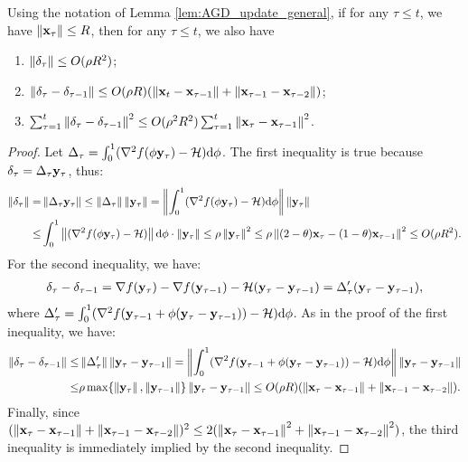 \begin{proposition} \label{prop:delta} Using the notation of Lemma \ref{lem:AGD_update_general},
if for any $\tau\le t$, we have $\left\|{\mathbf{x}_\tau}\right\| \le R$, then for any 
$\tau\le t$, we also have 
\begin{enumerate}
\item $\left\|{\delta_\tau}\right\| \le O(\rho R^2)$; 
\item $\left\|{\delta_\tau - \delta_{\tau -1}}\right\|
\le O(\rho R) (\left\|{\mathbf{x}_t - \mathbf{x}_{\tau-1}}\right\| +\left\|{\mathbf{x}_{\tau-1} - \mathbf{x}_{\tau-2}}\right\|)$;
\item $\sum_{\tau = 1}^t \left\|{\delta_\tau - \delta_{\tau -1}}\right\|^2 \le O(\rho^2 R^2)\sum_{\tau = 1}^t \left\|{\mathbf{x}_\tau -\mathbf{x}_{\tau - 1}}\right\|^2$.
\end{enumerate}
\end{proposition}
\begin{proof}
Let $\Delta_\tau = \int_0^1 (\nabla^2 f(\phi \mathbf{y}_\tau) - \mathcal{H}) \mathrm{d} \phi$.
The first inequality is true because $\delta_\tau = \Delta_\tau \mathbf{y}_\tau$, thus:
\begin{align*}
\left\|{\delta_\tau}\right\| = &\left\|{\Delta_\tau\mathbf{y}_\tau}\right\| \le \left\|{\Delta_\tau}\right\|\left\|{\mathbf{y}_\tau}\right\|
= \left\|{\int_0^1 (\nabla^2 f(\phi \mathbf{y}_\tau) - \mathcal{H}) \mathrm{d} \phi}\right\|\left\|{\mathbf{y}_\tau}\right\| \\
\le & \int_0^1\left\|{ (\nabla^2 f(\phi \mathbf{y}_\tau) - \mathcal{H})}\right\| \mathrm{d} \phi \cdot \left\|{\mathbf{y}_\tau}\right\|
\le \rho \left\|{\mathbf{y}_\tau}\right\|^2
\le \rho \left\|{(2-\theta)\mathbf{x}_\tau  - (1-\theta)\mathbf{x}_{\tau-1} }\right\|^2 \le O(\rho R^2).
\end{align*}
For the second inequality, we have:
\begin{align*}
\delta_\tau - \delta_{\tau-1} =\nabla f(\mathbf{y}_\tau) - \nabla f(\mathbf{y}_{\tau-1})  - \mathcal{H}(\mathbf{y}_\tau - \mathbf{y}_{\tau-1})
=\Delta'_\tau (\mathbf{y}_\tau - \mathbf{y}_{\tau-1}),
\end{align*}
where $\Delta'_\tau = \int_0^1 (\nabla^2 f(\mathbf{y}_{\tau-1} + \phi (\mathbf{y}_\tau - \mathbf{y}_{\tau-1})) - \mathcal{H}) \mathrm{d} \phi$.
As in the proof of the first inequality, we have:
\begin{align*}
\left\|{\delta_\tau - \delta_{\tau-1}}\right\| \le& \left\|{\Delta'_\tau}\right\|\left\|{\mathbf{y}_\tau - \mathbf{y}_{\tau-1}}\right\|
= \left\|{\int_0^1 (\nabla^2 f(\mathbf{y}_{\tau-1} + \phi (\mathbf{y}_\tau - \mathbf{y}_{\tau-1})) - \mathcal{H}) \mathrm{d} \phi}\right\|\left\|{\mathbf{y}_\tau - \mathbf{y}_{\tau-1}}\right\| \\
\le & \rho \max\{\left\|{\mathbf{y}_\tau}\right\|, \left\|{\mathbf{y}_{\tau-1}}\right\|\}\left\|{\mathbf{y}_\tau - \mathbf{y}_{\tau-1}}\right\| \le O(\rho R) (\left\|{\mathbf{x}_\tau - \mathbf{x}_{\tau-1}}\right\| +\left\|{\mathbf{x}_{\tau-1} - \mathbf{x}_{\tau-2}}\right\|).
\end{align*}
Finally, since $(\left\|{\mathbf{x}_\tau - \mathbf{x}_{\tau-1}}\right\| +\left\|{\mathbf{x}_{\tau-1} - \mathbf{x}_{\tau-2}}\right\|)^2 \le 2(\left\|{\mathbf{x}_\tau - \mathbf{x}_{\tau-1}}\right\|^2 + \left\|{\mathbf{x}_{\tau-1} - \mathbf{x}_{\tau-2}}\right\|^2)$, the third inequality is immediately implied by the second inequality.
\end{proof}

